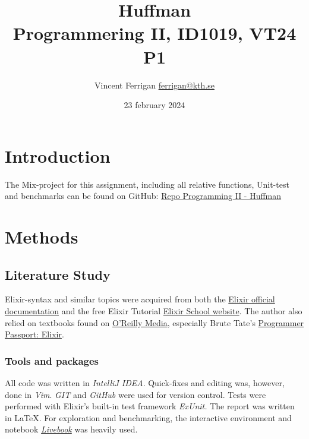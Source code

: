 \documentclass[a4paper,11pt]{article}
\begin{document}
\title{
    Huffman
\\\small{Programmering II, ID1019, VT24 P1}
}
\author{Vincent Ferrigan \href{mailto:ferrigan@kth.se}{ferrigan@kth.se}}

\date{23 february 2024}
\maketitle

\section*{Introduction}
\label{sec:introduction}

The Mix-project for this assignment, including all relative functions, Unit-test and benchmarks can be found on GitHub:
\href{https://github.com/VincentFerrigan/kth-id1019-programming-ii/tree/main/tasks/8/huffman}{Repo Programming II - Huffman}%

\section*{Methods}\label{sec:methods}
\subsection*{Literature Study}
\label{subsec:literaturestudy}
Elixir-syntax and similar topics were acquired
from both the
\href{https://elixir-lang.org/docs.html}{Elixir official documentation}
and the free Elixir Tutorial
\href{https://elixirschool.com/en}{Elixir School
website}.
The author also relied on textbooks found on
\href{https://learning.oreilly.com}{O'Reilly Media},
especially Brute Tate's
\href{https://learning.oreilly.com/library/view/programmer-passport-elixir/9781680509649/}{Programmer Passport: Elixir}.

\subsubsection*{Tools and packages}
\label{subsec:tools}
All code was written in \emph{IntelliJ IDEA}.
Quick-fixes and editing was, however, done in \emph{Vim}.
\emph{GIT} and \emph{GitHub} were used for version control.
Tests were performed with Elixir's built-in test framework \emph{ExUnit.}
The report was written in \LaTeX.
For exploration and benchmarking, the interactive environment and notebook
\href{https://livebook.dev/}{\emph{Livebook}}
was heavily used.
\end{document}
